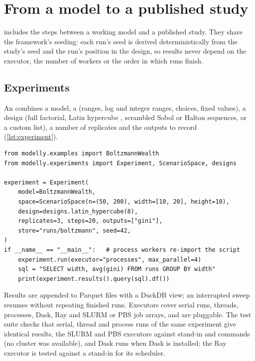 \section{From a model to a published study}
\label{sec:workflow}

\modelly{} includes the steps between a working model and a published study. They share the framework's seeding: each run's seed is derived deterministically from the study's
seed and the run's position in the design, so results never depend on the executor, the number
of workers or the order in which runs finish.

\subsection{Experiments}

An  combines a model, a  (ranges, log and integer ranges,
choices, fixed values), a design (full factorial, Latin hypercube \citep{mckay1979comparison},
scrambled Sobol \citep{sobol1967distribution, owen1998scrambling, matousek1998l2,
roy2023quasi} or Halton
\citep{halton1960efficiency}
sequences, or a custom list), a number
of replicates and the outputs to record (\cref{lst:experiment}).

\begin{lstlisting}[float=tp,caption={A Latin-hypercube sweep over two parameters, three replicates per point, run on four
processes; results are queried with SQL.},label={lst:experiment}]
from modelly.examples import BoltzmannWealth
from modelly.experiments import Experiment, ScenarioSpace, designs

experiment = Experiment(
    model=BoltzmannWealth,
    space=ScenarioSpace(n=(50, 200), width=[10, 20], height=10),
    design=designs.latin_hypercube(8),
    replicates=3, steps=20, outputs=["gini"],
    store="runs/boltzmann", seed=42,
)
if __name__ == "__main__":   # process workers re-import the script
    experiment.run(executor="processes", max_parallel=4)
    sql = "SELECT width, avg(gini) FROM runs GROUP BY width"
    print(experiment.results().query(sql).df())
\end{lstlisting}

Results are appended to Parquet files with a DuckDB view; an interrupted sweep resumes without
repeating finished runs. Executors cover serial runs, threads, processes, Dask, Ray and SLURM
or PBS job arrays, and are pluggable. The test suite checks that serial, thread and process
runs of the same experiment give identical results, the SLURM and PBS executors against
stand-in  and  commands (no cluster was available), and Dask runs
when Dask is installed; the Ray executor is tested against a stand-in for its scheduler.

